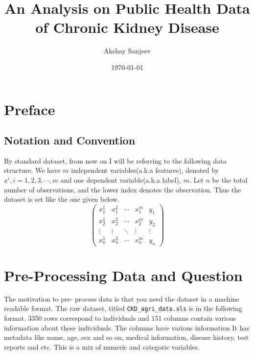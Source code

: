 \documentclass{article}
\title{An Analysis on Public Health Data of Chronic Kidney Disease}
\author{Akshay Sanjeev}
\date{\today}
\begin{document}
\maketitle

\section{Preface}
\subsection{Notation and Convention}
By standard dataset, from now on I will be referring to the following data structure. 
We have $m$ independent variables(a.k.a features), denoted by $x^i, i = 1,2,3, \cdots,m$ 
and one dependent variable(a.k.a label), $m$. Let $n$ be the total number of observations, 
and the lower index denotes the observation. Thus the dataset is set like the one given below. 
\begin{equation}
    \begin{pmatrix}
        x^1_1 & x^2_1 & \cdots & x^m_1 & y_1 \\
        x^1_2 & x^2_2 & \cdots & x^m_2 & y_2 \\
        \vdots & \vdots & \ddots & \vdots & \vdots \\
        x^1_n & x^2_n & \cdots & x^m_n & y_n
    \end{pmatrix}
\end{equation}



\section{Pre-Processing Data and Question}
The motivation to pre- process data is that you need the dataset in a 
machine readable format. The raw dataset, titled \texttt{CKD\_agri\_data.xls} is in the 
following format. 3350 rows correspond to individuals and 151 columns contain
various information about these individuals. The columns have various information It has
metadata like name, age, sex and so on, medical information, disease history, test reports and etc. 
This is a mix of numeric and categoric variables. 
\end{document}
